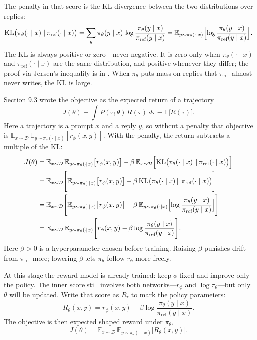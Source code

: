 The penalty in that score is the KL divergence between the two distributions over replies: \[
\mathrm{KL}\bigl(\pi_\theta(\cdot\mid x)\,\|\,\pi_{\text{ref}}(\cdot\mid x)\bigr)
=
\sum_{y}
\pi_\theta(y\mid x)\,
\log\frac{\pi_\theta(y\mid x)}{\pi_{\text{ref}}(y\mid x)}
=
\mathbb{E}_{y\sim\pi_\theta(\cdot\mid x)}\Bigl[\log\frac{\pi_\theta(y\mid x)}{\pi_{\text{ref}}(y\mid x)}\Bigr].
\] The KL is always positive or zero---never negative. It is zero only when $\pi_\theta(\cdot\mid x)$ and $\pi_{\text{ref}}(\cdot\mid x)$ are the same distribution, and positive whenever they differ; the proof via Jensen's inequality is in . When $\pi_\theta$ puts mass on replies that $\pi_{\text{ref}}$ almost never writes, the KL is large.

Section 9.3 wrote the objective as the expected return of a trajectory, \[
J(\theta)
=
\int P(\tau;\theta)\,R(\tau)\,d\tau
=
\mathbb{E}\bigl[R(\tau)\bigr].
\] Here a trajectory is a prompt $x$ and a reply $y$, so without a penalty that objective is $\mathbb{E}_{x\sim\mathcal{D}}\,\mathbb{E}_{y\sim\pi_\theta(\cdot\mid x)}[r_\phi(x,y)]$. With the penalty, the return subtracts a multiple of the KL: \[
\begin{aligned}
J(\theta)
&=
\mathbb{E}_{x\sim\mathcal{D}}\,
\mathbb{E}_{y\sim\pi_\theta(\cdot\mid x)}
\bigl[r_\phi(x,y)\bigr]
-
\beta\,
\mathbb{E}_{x\sim\mathcal{D}}
\Bigl[
\mathrm{KL}\bigl(\pi_\theta(\cdot\mid x)\,\|\,\pi_{\text{ref}}(\cdot\mid x)\bigr)
\Bigr]
\\
&=
\mathbb{E}_{x\sim\mathcal{D}}
\Biggl[
\mathbb{E}_{y\sim\pi_\theta(\cdot\mid x)}\bigl[r_\phi(x,y)\bigr]
-
\beta\,
\mathrm{KL}\bigl(\pi_\theta(\cdot\mid x)\,\|\,\pi_{\text{ref}}(\cdot\mid x)\bigr)
\Biggr]
\\
&=
\mathbb{E}_{x\sim\mathcal{D}}
\Biggl[
\mathbb{E}_{y\sim\pi_\theta(\cdot\mid x)}\bigl[r_\phi(x,y)\bigr]
-
\beta\,
\mathbb{E}_{y\sim\pi_\theta(\cdot\mid x)}\Bigl[\log\frac{\pi_\theta(y\mid x)}{\pi_{\text{ref}}(y\mid x)}\Bigr]
\Biggr]
\\
&=
\mathbb{E}_{x\sim\mathcal{D}}\,
\mathbb{E}_{y\sim\pi_\theta(\cdot\mid x)}
\Biggl[
r_\phi(x,y)
-
\beta\log\frac{\pi_\theta(y\mid x)}{\pi_{\text{ref}}(y\mid x)}
\Biggr].
\end{aligned}
\] Here $\beta>0$ is a hyperparameter chosen before training. Raising $\beta$ punishes drift from $\pi_{\text{ref}}$ more; lowering $\beta$ lets $\pi_\theta$ follow $r_\phi$ more freely.

At this stage the reward model is already trained: keep $\phi$ fixed and improve only the policy. The inner score still involves both networks---$r_\phi$ and $\log\pi_\theta$---but only $\theta$ will be updated. Write that score as $R_\theta$ to mark the policy parameters: \[
R_\theta(x,y)
=
r_\phi(x,y)-\beta\log\frac{\pi_\theta(y\mid x)}{\pi_{\text{ref}}(y\mid x)}.
\] The objective is then expected shaped reward under $\pi_\theta$, \begin{equation}
J(\theta)
=
\mathbb{E}_{x\sim\mathcal{D}}\,
\mathbb{E}_{y\sim\pi_\theta(\cdot\mid x)}
\bigl[R_\theta(x,y)\bigr].
\tag{11.4}
\end{equation}

